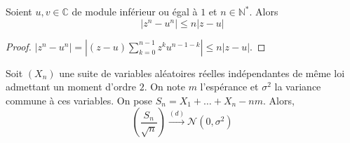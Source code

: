 
	\begin{lemma}
		\label{theoreme-central-limite-2}
		Soient $u, v \in \mathbb{C}$ de module inférieur ou égal à $1$ et $n \in \mathbb{N}^*$. Alors
		\[ |z^n - u^n| \leq n |z-u| \]
	\end{lemma}

	\begin{proof}
		$|z^n - u^n| = |(z-u) \sum_{k=0}^{n-1} z^k u^{n-1-k}| \leq n |z-u|$.
	\end{proof}

	\begin{theorem}
		Soit $(X_n)$ une suite de variables aléatoires réelles indépendantes de même loi admettant un moment d'ordre $2$. On note $m$ l'espérance et $\sigma^2$ la variance commune à ces variables. On pose $S_n = X_1 + \dots + X_n - nm$. Alors,
		\[ \left ( \frac{S_n}{\sqrt{n}} \right) \overset{(d)}{\longrightarrow} \mathcal{N}(0, \sigma^2) \]
	\end{theorem}

